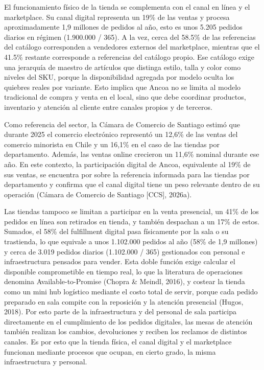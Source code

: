 \documentclass[11pt]{article}
\begin{document}
El funcionamiento físico de la tienda se complementa con el canal en línea y el marketplace. Su canal digital representa un 19\% de las ventas y procesa aproximadamente 1,9 millones de pedidos al año, esto es unos 5.205 pedidos diarios en régimen (1.900.000 / 365). A la vez, cerca del 58.5\% de las referencias del catálogo corresponden a vendedores externos del marketplace, mientras que el 41.5\% restante corresponde a referencias del catálogo propio. Ese catálogo exige una jerarquía de maestro de artículos que distinga estilo, talla y color como niveles del SKU, porque la disponibilidad agregada por modelo oculta los quiebres reales por variante. Esto implica que Ancoa no se limita al modelo tradicional de compra y venta en el local, sino que debe coordinar productos, inventario y atención al cliente entre canales propios y de terceros.

Como referencia del sector, la Cámara de Comercio de Santiago estimó que durante 2025 el comercio electrónico representó un 12,6\% de las ventas del comercio minorista en Chile y un 16,1\% en el caso de las tiendas por departamento. Además, las ventas online crecieron un 11,6\% nominal durante ese año. En este contexto, la participación digital de Ancoa, equivalente al 19\% de sus ventas, se encuentra por sobre la referencia informada para las tiendas por departamento y confirma que el canal digital tiene un peso relevante dentro de su operación (Cámara de Comercio de Santiago {[}CCS{]}, 2026a).

Las tiendas tampoco se limitan a participar en la venta presencial, un 41\% de los pedidos en línea son retirados en tienda, y también despachan a un 17\% de estos. Sumados, el 58\% del fulfillment digital pasa físicamente por la sala o su trastienda, lo que equivale a unos 1.102.000 pedidos al año (58\% de 1,9 millones) y cerca de 3.019 pedidos diarios (1.102.000 / 365) gestionados con personal e infraestructura pensados para vender. Esta doble función exige calcular el disponible comprometible en tiempo real, lo que la literatura de operaciones denomina Available-to-Promise (Chopra \& Meindl, 2016), y costear la tienda como un mini hub logístico mediante el costo total de servir, porque cada pedido preparado en sala compite con la reposición y la atención presencial (Hugos, 2018). Por esto parte de la infraestructura y del personal de sala participa directamente en el cumplimiento de los pedidos digitales, las mesas de atención también realizan los cambios, devoluciones y reciben los reclamos de distintos canales. Es por esto que la tienda física, el canal digital y el marketplace funcionan mediante procesos que ocupan, en cierto grado, la misma infraestructura y personal.
\end{document}
